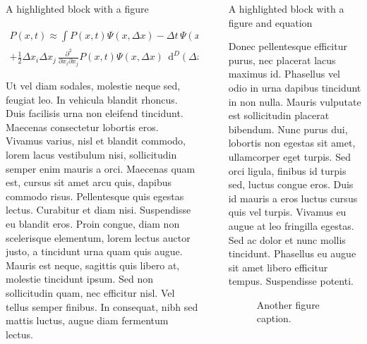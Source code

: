 \documentclass[final]{beamer}
\newlength{\sepwidth}
\newlength{\colwidth}
\newcommand{\separatorcolumn}{\begin{column}{\sepwidth}\end{column}}
\begin{document}
\begin{frame}[t]
\begin{columns}[t]
\begin{column}{\colwidth}
\begin{alertblock}{A highlighted block with a figure}
    
\begin{align*}
P(x,t) \approx
\int  P(x,t) \Psi\left(x, \Delta x \right)  - \Delta t \, \Psi\left(x, \Delta x \right) \frac{ \partial P(x,t) }{ \partial t}  - \Delta x_{i} \, \frac{\partial }{\partial x_{i}}  P(x,t) \Psi\left(x, \Delta x \right)   \\
 + \frac{1}{2} \Delta x_{i} \Delta x_{j} \, \frac{\partial^2}{\partial x_{i} \partial x_{j} }  P(x,t) \Psi\left(x, \Delta x \right) \; \, \mathrm d^D \! \left( \Delta x \right)
\end{align*}

Ut vel diam sodales, molestie neque sed, feugiat leo. In vehicula blandit rhoncus. Duis facilisis urna non eleifend tincidunt. Maecenas consectetur lobortis eros. Vivamus varius, nisl et blandit commodo, lorem lacus vestibulum nisi, sollicitudin semper enim mauris a orci. Maecenas quam est, cursus sit amet arcu quis, dapibus commodo risus. Pellentesque quis egestas lectus. Curabitur et diam nisi. Suspendisse eu blandit eros. Proin congue, diam non scelerisque elementum, lorem lectus auctor justo, a tincidunt urna quam quis augue. Mauris est neque, sagittis quis libero at, molestie tincidunt ipsum. Sed non sollicitudin quam, nec efficitur nisl. Vel tellus semper finibus. In
        consequat, nibh sed mattis luctus, augue diam fermentum lectus.
  \end{alertblock}
          
    \vspace{0pt}
    \end{column}

\separatorcolumn


\begin{column}{\colwidth}
    \begin{alertblock}{A highlighted block with a figure and equation}

   Donec pellentesque efficitur purus, nec placerat lacus maximus id. Phasellus vel odio in urna dapibus tincidunt in non nulla. Mauris vulputate est sollicitudin placerat bibendum. Nunc purus dui, lobortis non egestas sit amet, ullamcorper eget turpis. Sed orci ligula, finibus id turpis sed, luctus congue eros. Duis id mauris a eros luctus cursus quis vel turpis. Vivamus eu augue at leo fringilla egestas. Sed ac dolor et nunc mollis tincidunt. Phasellus eu augue sit amet libero efficitur tempus. Suspendisse potenti. 
    \begin{figure}
      \centering
      \caption{Another figure caption.}
    \end{figure}
    

\end{alertblock}
\end{column}
\end{columns}
\end{frame}
\end{document}
